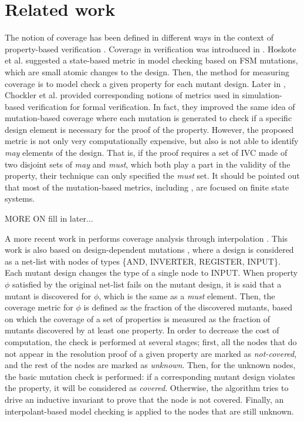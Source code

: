 \section{Related work}
\label{sec:related}
 
The notion of coverage has been defined in different ways in the context of property-based verification \cite{chockler2008causes, chockler2006coverage, chockler_coverage_2003, katz1999have, grosse2007estimating, claessen2007coverage}.
Coverage in verification was introduced in \cite{hoskote1999coverage, katz1999have}. Hoskote et al. \cite{hoskote1999coverage} suggested a state-based metric in model checking based on FSM mutations, which are small atomic changes to the design. Then, the method for measuring coverage is to model check a given property for each mutant design. 
Later in \cite{chockler_coverage_2003}, Chockler et al. provided corresponding notions of metrics used in simulation-based verification for formal verification. In fact, they improved the same idea of mutation-based coverage where each mutation is generated to check if a specific
design element is necessary for the proof of the property. 
 However, the proposed metric is not only very computationally expensive, but also is not able to identify \emph{may} elements of the design. That is, if the proof requires a set of IVC made of two disjoint sets of \emph{may} and \emph{must}, which both play a part in the validity of the property, their technique can only specified the \emph{must} set. It should be pointed out that most of the mutation-based metrics, including \cite{kupferman_theory_2008, chockler2001practical}, are focused on finite state systems. 
 
 MORE ON \cite{Kupferman:2006:SCF} fill in later...

A more recent work in \cite{chockler2010coverage} performs coverage analysis through interpolation \cite{mcmillan2003interpolation}. This work is also based on design-dependent mutations \cite{chockler_coverage_2003}, where a design is considered as a net-list with nodes of types \{AND, INVERTER, REGISTER, INPUT\}. Each mutant design changes the type of a single node to INPUT. When property $\phi$ satisfied by the original net-list fails on the mutant design, it is said that a mutant is discovered for $\phi$, which is the same as a \emph{must} element.
Then, the coverage metric for $\phi$ is defined as the fraction of the discovered mutants, based on which the coverage of a set of properties is measured as the fraction of mutants discovered by at least one property. 
In order to decrease the cost of computation, the check is performed at several stages; first, all the nodes that do not appear in the resolution proof of a given property are marked as \emph{not-covered}, and the rest of the nodes are marked as \emph{unknown}. Then, for the unknown nodes, the basic mutation check is performed: if a corresponding mutant design violates the property, it will be considered as \emph{covered}. Otherwise, the algorithm tries to drive an inductive invariant to prove that the node is not covered. Finally, an interpolant-based model checking is applied to the nodes that are still unknown.

